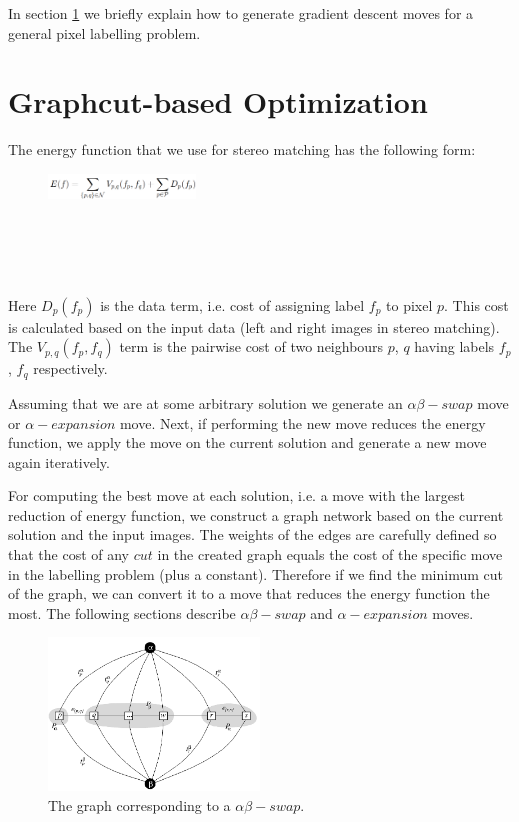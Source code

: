 \documentclass[letterpaper, 10 pt, conference]{ieeeconf}  %
\begin{document}
In section \ref{graphcut} we briefly explain how to generate gradient descent moves for a general pixel labelling problem.

\section{Graphcut-based Optimization}
\label{graphcut}
The energy function that we use for stereo matching has the following form:
\begin{figure}[h]
                \centering
                \includegraphics[width=0.35\textwidth]{imgs/energy.png}
                \label{fig:farm}
\end{figure}
\\ \\ \\ \\
Here $D_p(f_p)$ is the data term, i.e. cost of assigning label $f_p$ to pixel $p$. This cost is calculated based on the input data (left and right images in stereo matching). The $V_{p,q}(f_p,f_q)$ term is the pairwise cost of two neighbours $p$, $q$ having labels $f_p$, $f_q$ respectively. 

Assuming that we are at some arbitrary solution we generate an $\alpha\beta-swap$ move or $\alpha-expansion$ move. Next, if performing the new move reduces the energy function, we apply the move on the current solution and generate a new move again iteratively. 

For computing the best move at each solution, i.e. a move with the largest reduction of energy function, we construct a graph network based on the current solution and the input images. The weights of the edges are carefully defined so that the cost of any $cut$ in the created graph equals the cost of the specific move in the labelling problem (plus a constant). Therefore if we find the minimum cut of the graph, we can convert it to a move that reduces the energy function the most.  The following sections describe $\alpha\beta-swap$ and $\alpha-expansion$ moves.

\begin{figure}[h]
                \centering
                \includegraphics[width=0.5\textwidth]{imgs/swap.png}
                \caption{The graph corresponding to a $\alpha\beta-swap$.}
                \label{abswap}
\end{figure}
\end{document}
